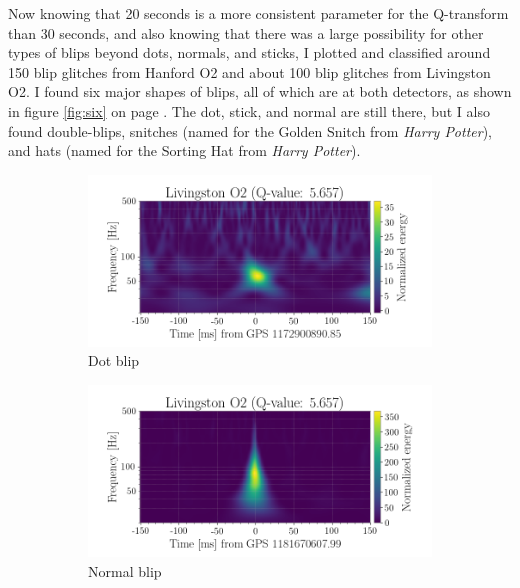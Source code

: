 \documentclass[a4paper]{article}
\begin{document}
Now knowing that 20 seconds is a more consistent parameter for the Q-transform than 30 seconds, and also knowing that there was a large possibility for other types of blips beyond dots, normals, and sticks, I plotted and classified around 150 blip glitches from Hanford O2 and about 100 blip glitches from Livingston O2. I found six major shapes of blips, all of which are at both detectors, as shown in figure \ref{fig:six} on page \pageref{fig:six}. The dot, stick, and normal are still there, but I also found double-blips, snitches (named for the Golden Snitch from \textit{Harry Potter}), and hats (named for the Sorting Hat from \textit{Harry Potter}). 

\begin{figure}[h!]
	\centering
	\begin{subfigure}{.49\textwidth}
		\centering
		\includegraphics[width=1\linewidth]{dot_O2}
		\caption{Dot blip}
		\label{fig:dot_O2}
	\end{subfigure}
	\begin{subfigure}{.49\textwidth}
		\centering
		\includegraphics[width=1\linewidth]{normal_O2}
		\caption{Normal blip}
		\label{fig:normal_O2}
	\end{subfigure}
	\begin{subfigure}{.49\textwidth}

\end{subfigure}
\end{figure}
\end{document}
